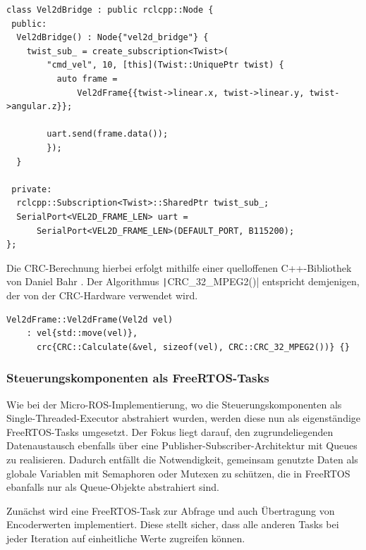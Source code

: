 \begin{code}
\begin{verbatim}
class Vel2dBridge : public rclcpp::Node {
 public:
  Vel2dBridge() : Node{"vel2d_bridge"} {
    twist_sub_ = create_subscription<Twist>(
        "cmd_vel", 10, [this](Twist::UniquePtr twist) {
          auto frame =
              Vel2dFrame{{twist->linear.x, twist->linear.y, twist->angular.z}};

        uart.send(frame.data());
        });
  }

 private:
  rclcpp::Subscription<Twist>::SharedPtr twist_sub_;
  SerialPort<VEL2D_FRAME_LEN> uart =
      SerialPort<VEL2D_FRAME_LEN>(DEFAULT_PORT, B115200);
};
\end{verbatim}
\end{code}

Die CRC-Berechnung hierbei erfolgt mithilfe einer quelloffenen C++-Bibliothek
von Daniel Bahr \cite{CRCpp}. Der Algorithmus \texttt|CRC_32_MPEG2()|
entspricht demjenigen, der von der CRC-Hardware verwendet wird.

\begin{code}
\begin{verbatim}
Vel2dFrame::Vel2dFrame(Vel2d vel)
    : vel{std::move(vel)},
      crc{CRC::Calculate(&vel, sizeof(vel), CRC::CRC_32_MPEG2())} {}
\end{verbatim}
\end{code}

\subsubsection{Steuerungskomponenten als FreeRTOS-Tasks}

Wie bei der Micro-ROS-Implementierung, wo die Steuerungskomponenten als
Single-Threaded-Executor abstrahiert wurden, werden diese nun als eigenständige
FreeRTOS-Tasks umgesetzt. Der Fokus liegt darauf, den zugrundeliegenden
Datenaustausch ebenfalls über eine Publisher-Subscriber-Architektur mit Queues
zu realisieren. Dadurch entfällt die Notwendigkeit, gemeinsam genutzte Daten als
globale Variablen mit Semaphoren oder Mutexen zu schützen, die in FreeRTOS
ebanfalls nur als Queue-Objekte abstrahiert sind.

Zunächst wird eine FreeRTOS-Task zur Abfrage und auch Übertragung von
Encoderwerten implementiert. Diese stellt sicher, dass alle anderen Tasks bei
jeder Iteration auf einheitliche Werte zugreifen können.

